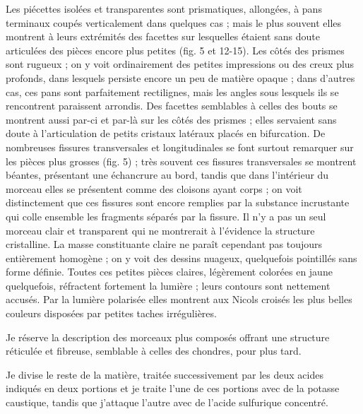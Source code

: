 \documentclass[a4paper, 12pt, oneside, french]{book}
\begin{document}
Les piécettes isolées et transparentes sont prismatiques, allongées, à pans terminaux coupés verticalement dans quelques cas ; mais le plus souvent elles montrent à leurs extrémités des facettes sur lesquelles étaient sans doute articulées des pièces encore plus petites (fig. 5 et 12-15). Les côtés des prismes sont rugueux ; on y voit ordinairement des petites impressions ou des creux plus profonds, dans lesquels persiste encore un peu de matière opaque ; dans d'autres cas, ces pans sont parfaitement rectilignes, mais les angles sous lesquels ils se rencontrent paraissent arrondis. Des facettes semblables à celles des bouts se montrent aussi par-ci et par-là sur les côtés des prismes ; elles servaient sans doute à l'articulation de petits cristaux latéraux placés en bifurcation. De nombreuses fissures transversales et longitudinales se font surtout remarquer sur les pièces plus grosses (fig. 5) ; très souvent ces fissures transversales se montrent béantes, présentant une échancrure au bord, tandis que dans l'intérieur du morceau elles se présentent comme des \og cloisons ayant corps \fg ; on voit distinctement que ces fissures sont encore remplies par la substance incrustante qui colle ensemble les fragments séparés par la fissure. Il n'y a pas un seul morceau clair et transparent qui ne montrerait à l'évidence la structure cristalline. La masse constituante claire ne paraît cependant pas toujours entièrement homogène ; on y voit des dessins nuageux, quelquefois pointillés sans forme définie. Toutes ces petites pièces claires, légèrement colorées en jaune quelquefois, réfractent fortement la lumière ; leurs contours sont nettement accusés. Par la lumière polarisée elles montrent aux Nicols croisés les plus belles couleurs disposées par petites taches irrégulières.

Je réserve la description des morceaux plus composés offrant une structure réticulée et fibreuse, semblable à celles des chondres, pour plus tard.

Je divise le reste de la matière, traitée successivement par les deux acides indiqués en deux portions et je traite l'une de ces portions avec de la potasse caustique, tandis que j'attaque l'autre avec de l'acide sulfurique concentré.
\end{document}
